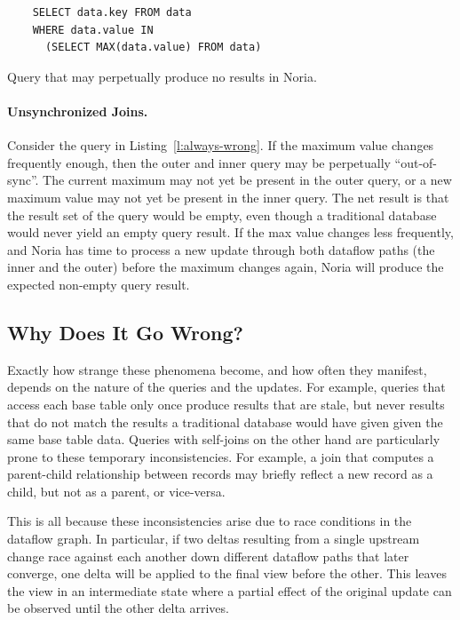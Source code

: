 \begin{listing}[h]
  \begin{verbatim}
    SELECT data.key FROM data
    WHERE data.value IN
      (SELECT MAX(data.value) FROM data)
  \end{verbatim}
  \caption{Query that may perpetually produce no results in Noria.}
  \label{l:always-wrong}
\end{listing}

\paragraph{Unsynchronized Joins.}
Consider the query in Listing~\vref{l:always-wrong}. If the maximum value
changes frequently enough, then the outer and inner query may be perpetually
``out-of-sync''. The current maximum may not yet be present in the outer query,
or a new maximum value may not yet be present in the inner query. The net result
is that the result set of the query would be empty, even though a traditional
database would never yield an empty query result. If the max value changes less
frequently, and Noria has time to process a new update through both dataflow
paths (the inner and the outer) before the maximum changes again, Noria will
produce the expected non-empty query result.

\subsection{Why Does It Go Wrong?}

Exactly how strange these phenomena become, and how often they manifest, depends
on the nature of the queries and the updates. For example, queries that access
each base table only once produce results that are stale, but never results that
do not match the results a traditional database would have given given the same
base table data. Queries with self-joins on the other hand are particularly
prone to these temporary inconsistencies. For example, a join that computes a
parent-child relationship between records may briefly reflect a new record as a
child, but not as a parent, or vice-versa.

This is all because these inconsistencies arise due to race conditions in the
dataflow graph. In particular, if two deltas resulting from a single upstream
change race against each another down different dataflow paths that later
converge, one delta will be applied to the final view before the other. This
leaves the view in an intermediate state where a partial effect of the original
update can be observed until the other delta arrives.

